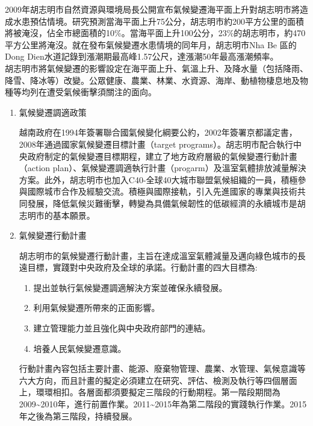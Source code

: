 \documentclass[a4paper,12pt]{article}
\begin{document}
\begin{enumerate}
\begin{enumerate}
2009年胡志明市自然資源與環境局長公開宣布氣候變遷海平面上升對胡志明市將造成水患預估情境。研究預測當海平面上升75公分，胡志明市約200平方公里的面積將被淹沒，佔全市總面積的10\%。當海平面上升100公分，23\%的胡志明市，約470平方公里將淹沒。就在發布氣候變遷水患情境的同年月，胡志明市Nha Be 區的Dong Dien水道記錄到漲潮期最高峰1.57公尺，達漲潮50年最高漲潮頻率。\\

胡志明市將氣候變遷的影響設定在海平面上升、氣溫上升、及降水量（包括降雨、降雪、降冰等）改變。公眾健康、農業、林業、水資源、海岸、動植物棲息地及物種等均列在遭受氣候衝擊須關注的面向。\\
\begin{enumerate}
\item 氣候變遷調適政策
\label{sec:org96ebc8f}

越南政府在1994年簽署聯合國氣候變化綱要公約，2002年簽署京都議定書，2008年通過國家氣候變遷目標計畫（target programs）。胡志明市配合執行中央政府制定的氣候變遷目標期程，建立了地方政府層級的氣候變遷行動計畫（action plan）、氣候變遷調適執行計畫（progarm）及溫室氣體排放減量解決方案。此外，胡志明市也加入C40-全球40大城市聯盟氣候組織的一員，積極參與國際城市合作及經驗交流。積極與國際接軌，引入先進國家的專業與技術共同發展，降低氣候災難衝擊，轉變為具備氣候韌性的低碳經濟的永續城市是胡志明市的基本願景。\\
\item 氣候變遷行動計畫
\label{sec:org02c67a1}

胡志明市的氣候變遷行動計畫，主旨在達成溫室氣體減量及邁向綠色城市的長遠目標，實踐對中央政府及全球的承諾。行動計畫的四大目標為:\\
\begin{enumerate}
\item 提出並執行氣候變遷調適解決方案並確保永續發展。\\
\item 利用氣候變遷所帶來的正面影響。\\
\item 建立管理能力並且強化與中央政府部門的連結。\\
\item 培養人民氣候變遷意識。\\
\end{enumerate}
行動計畫內容包括主要計畫、能源、廢棄物管理、農業、水管理、氣候意識等六大方向，而且計畫的擬定必須建立在研究、評估、檢測及執行等四個層面上，環環相扣。各層面都須要擬定三階段的行動期程。第一階段期間為2009\textasciitilde{}2010年，進行前置作業。2011\textasciitilde{}2015年為第二階段的實踐執行作業。2015年之後為第三階段，持續發展。\\


\end{enumerate}
\end{enumerate}
\end{enumerate}
\end{document}
